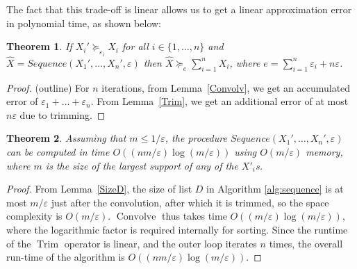 \documentclass{article}
\newtheorem{theorem}{Theorem}
\DeclareMathOperator{\Trim}{Trim}
\begin{document}
The fact that this trade-off is linear allows us to get a linear approximation error 
in polynomial time, as shown below:



\begin{theorem}
If $X_i' \succeq_{\varepsilon_i} X_i$ for all $i \in\{1,\dots,n\}$ and $\hat{X}= Sequence(X_1',\dots,X_n', \varepsilon)$ then
$\hat{X} \succeq_e \sum_{i=1}^{n} X_{i}$, where $e={\sum_{i=1}^n\varepsilon_i + n \varepsilon}$. 
\label{appSeqTheorem}
\end{theorem} 

\begin{proof} (outline) For $n$ iterations, from Lemma~\ref{Convolv}, we get an accumulated error of 
$\varepsilon_1 +\dots+ \varepsilon_n$. From Lemma~\ref{Trim}, we get an additional error of at most $n\varepsilon$ due to trimming. 
\end{proof}


\begin{theorem} \label{appSeqComplexTheorem}
Assuming that $m \leq 1/\varepsilon$, the procedure
$Sequence(X_1',\dots,X_n', \varepsilon)$ can be computed
in time $O((nm/\varepsilon)\log(m/\varepsilon))$ using $O(m/\varepsilon)$ memory, where $m$ is the size of the largest support of any of the $X'_i$s.
\end{theorem} 

\begin{proof}
From Lemma~\ref{SizeD}, the size of list $D$ in Algorithm \ref{alg:sequence} is at most $m/\varepsilon$
just after the convolution, after which it is trimmed, so the space complexity is $O(m/\varepsilon)$.
$\operatorname{Convolve}$ thus takes time $O((m/\varepsilon)\log(m/\varepsilon))$, where the logarithmic factor
is required internally
for sorting. Since the runtime of  the $\Trim$ operator is linear, and the
outer loop iterates $n$ times, the overall 
run-time of the algorithm is $O((n m/\varepsilon) \log(m/\varepsilon))$.
\end{proof}
\end{document}
